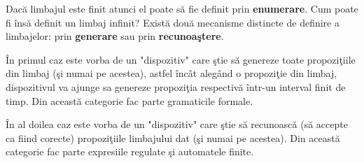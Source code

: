 Dacă limbajul este finit atunci el poate să fie definit prin \textbf{enumerare}. Cum poate fi însă definit un limbaj infinit? Există două mecanisme distincte de definire a limbajelor: prin \textbf{generare} sau prin \textbf{recunoaştere}.

În primul caz este vorba de un "dispozitiv" care ştie să genereze toate propoziţiile din limbaj (şi numai pe acestea), astfel încât alegând o propoziţie din limbaj, dispozitivul va ajunge sa genereze propoziţia respectivă într-un interval finit de timp. Din această categorie fac parte gramaticile formale.

În al doilea caz este vorba de un "dispozitiv" care ştie să recunoască (să accepte ca fiind corecte) propoziţiile limbajului dat (şi numai pe acestea). Din această categorie fac parte expresiile regulate şi automatele finite.